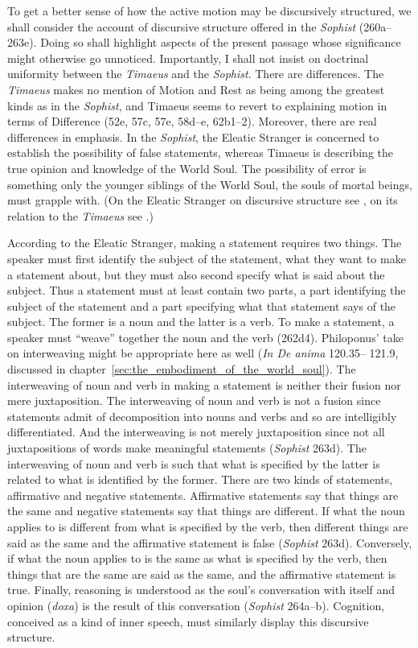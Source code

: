 To get a better sense of how the active motion may be discursively structured, we shall consider the account of discursive structure offered in the \emph{Sophist} (260a--263e). Doing so shall highlight aspects of the present passage whose significance might otherwise go unnoticed. Importantly, I shall not insist on doctrinal uniformity between the \emph{Timaeus} and the \emph{Sophist}. There are differences. The \emph{Timaeus} makes no mention of Motion and Rest as being among the greatest kinds as in the \emph{Sophist}, and Timaeus seems to revert to explaining motion in terms of Difference (52e, 57c, 57e, 58d--e, 62b1--2). Moreover, there are real differences in emphasis. In the \emph{Sophist}, the Eleatic Stranger is concerned to establish the possibility of false statements, whereas Timaeus is describing the true opinion and knowledge of the World Soul. The possibility of error is something only the younger siblings of the World Soul, the souls of mortal beings, must grapple with. (On the Eleatic Stranger on discursive structure see \citealt[]{Frede:1992ec}, on its relation to the \emph{Timaeus} see \citealt[]{Betegh:2019fq}.)

According to the Eleatic Stranger, making a statement requires two things. The speaker must first identify the subject of the statement, what they want to make a statement about, but they must also second specify what is said about the subject. Thus a statement must at least contain two parts, a part identifying the subject of the statement and a part specifying what that statement says of the subject. The former is a noun and the latter is a verb. To make a statement, a speaker must ``weave'' together the noun and the verb (262d4). Philoponus' take on interweaving might be appropriate here as well (\emph{In De anima} 120.35– 121.9, discussed in chapter~\ref{sec:the_embodiment_of_the_world_soul}). The interweaving of noun and verb in making a statement is neither their fusion nor mere juxtaposition. The interweaving of noun and verb is not a fusion since statements admit of decomposition into nouns and verbs and so are intelligibly differentiated. And the interweaving is not merely juxtaposition since not all juxtapositions of words make meaningful statements (\emph{Sophist} 263d). The interweaving of noun and verb is such that what is specified by the latter is related to what is identified by the former. There are two kinds of statements, affirmative and negative statements. Affirmative statements say that things are the same and negative statements say that things are different. If what the noun applies to is different from what is specified by the verb, then different things are said as the same and the affirmative statement is false (\emph{Sophist} 263d). Conversely, if what the noun applies to is the same as what is specified by the verb, then things that are the same are said as the same, and the affirmative statement is true. Finally, reasoning is understood as the soul's conversation with itself and opinion (\emph{doxa}) is the result of this conversation (\emph{Sophist} 264a--b). Cognition, conceived as a kind of inner speech, must similarly display this discursive structure.

